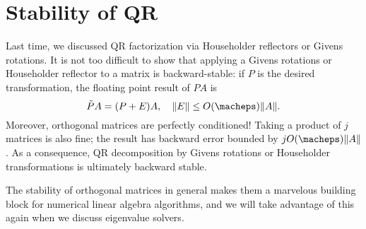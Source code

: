 \section{Stability of QR}

Last time, we discussed QR factorization via Householder reflectors
or Givens rotations.  It is not too difficult to
show that applying a Givens rotations or Householder reflector to
a matrix is backward-stable: if $P$ is the desired transformation,
the floating point result of $PA$ is
\[
  \tilde{P} A = (P+E) A, \quad \|E\| \leq O(\macheps) \|A\|.
\]
Moreover, orthogonal matrices are perfectly conditioned!
Taking a product of $j$ matrices is also fine; the result
has backward error bounded by $j O(\macheps) \|A\|$.
As a consequence, QR decomposition by Givens rotations or Householder
transformations is ultimately backward stable.

The stability of orthogonal matrices in general makes them a
marvelous building block for numerical linear algebra algorithms,
and we will take advantage of this again when we discuss
eigenvalue solvers.
